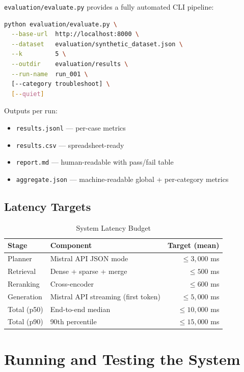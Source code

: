 \documentclass[12pt,a4paper]{report}
\begin{document}
\texttt{evaluation/evaluate.py} provides a fully automated CLI pipeline:

\begin{lstlisting}[language=bash, caption={Evaluation CLI}]
python evaluation/evaluate.py \
  --base-url  http://localhost:8000 \
  --dataset   evaluation/synthetic_dataset.json \
  --k         5 \
  --outdir    evaluation/results \
  --run-name  run_001 \
  [--category troubleshoot] \
  [--quiet]
\end{lstlisting}

\noindent Outputs per run:
\begin{itemize}
  \item \texttt{results.jsonl} --- per-case metrics
  \item \texttt{results.csv} --- spreadsheet-ready
  \item \texttt{report.md} --- human-readable with pass/fail table
  \item \texttt{aggregate.json} --- machine-readable global + per-category metrics
\end{itemize}

\section{Latency Targets}

\begin{table}[H]
\centering
\caption{System Latency Budget}
\begin{tabular}{@{}llr@{}}
\toprule
\textbf{Stage} & \textbf{Component} & \textbf{Target (mean)} \\
\midrule
Planner & Mistral API JSON mode & $\leq 3{,}000$ ms \\
Retrieval & Dense + sparse + merge & $\leq 500$ ms \\
Reranking & Cross-encoder & $\leq 600$ ms \\
Generation & Mistral API streaming (first token) & $\leq 5{,}000$ ms \\
\midrule
Total (p50) & End-to-end median & $\leq 10{,}000$ ms \\
Total (p90) & 90th percentile & $\leq 15{,}000$ ms \\
\bottomrule
\end{tabular}
\end{table}

\chapter{Running and Testing the System}
\end{document}
